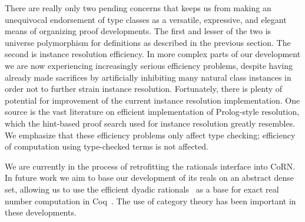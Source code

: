 \documentclass[a4paper,10pt,runningheads]{llncs}
\begin{document}


There are really only two pending concerns that keeps us from making an unequivocal endorsement of type classes as a versatile, expressive, and elegant means of organizing proof developments. The first and lesser of the two is universe polymorphism for definitions as described in the previous section. The second is instance resolution efficiency. In more complex parts of our development we are now experiencing increasingly serious efficiency problems, despite having already made sacrifices by artificially inhibiting many natural class instances in order not to further strain instance resolution.
Fortunately, there is plenty of potential for improvement of the current instance resolution implementation. One source is the vast literature on efficient implementation of Prolog-style resolution, which the hint-based proof search used for instance resolution greatly resembles. We emphasize that these efficiency problems only affect type checking; efficiency of computation using type-checked terms is not affected.


We are currently in the process of retrofitting the rationals interface into CoRN. In future work we aim to base our development of its reals on an abstract dense set, allowing us to use the efficient dyadic rationals~\cite{boldo2009combining} as a base for exact real number computation in Coq~\cite{Riemann,Oconnor:real}. The use of category theory has been important in these developments. %
\end{document}
